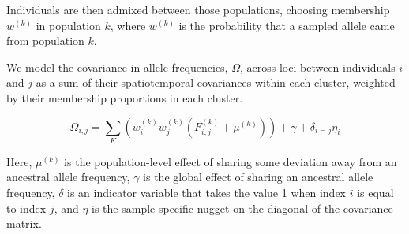 \documentclass[12pt]{article}
\begin{document}
Individuals are then admixed between those populations, 
choosing membership $w^{(k)}$ in population $k$, 
where $w^{(k)}$ is the probability that a sampled allele came from population $k$.

We model the covariance in allele frequencies, $\Omega$, across loci between individuals $i$ and $j$
as a sum of their spatiotemporal covariances within each cluster, weighted by their
membership proportions in each cluster.

\begin{equation}
\label{eq:total_cov}
\Omega_{i,j} = \sum\limits_K \left(w_i^{(k)}w_j^{(k)} \left( F^{(k)}_{i,j} + \mu^{(k)} \right)\right) + \gamma + \delta_{i=j} \eta_i
\end{equation}

Here, $\mu^{(k)}$ is the population-level effect of sharing some deviation away from an ancestral allele frequency, 
$\gamma$ is the global effect of sharing an ancestral allele frequency, $\delta$ is an indicator variable that takes the value 1 when index $i$ is equal to index $j$, and $\eta$ is the sample-specific nugget on the diagonal of the covariance matrix.
\newpage
\end{document}

